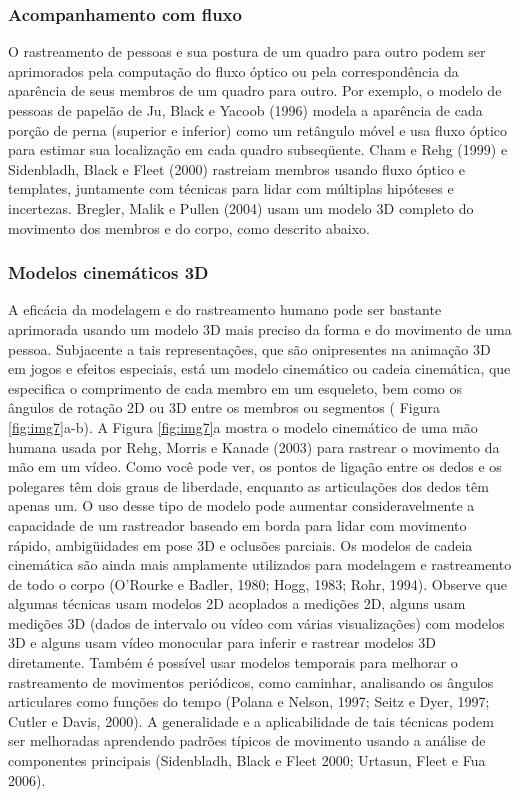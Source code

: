 \documentclass{article}
\begin{document}
\subsubsection{Acompanhamento com fluxo}
O rastreamento de pessoas e sua postura de um quadro para outro podem ser aprimorados pela computação do fluxo óptico ou pela correspondência da aparência de seus membros de um quadro para outro. Por exemplo, o modelo de pessoas de papelão de Ju, Black e Yacoob (1996) modela a aparência de cada porção de perna (superior e inferior) como um retângulo móvel e usa fluxo óptico para estimar sua localização em cada quadro subseqüente. Cham e Rehg (1999) e Sidenbladh, Black e Fleet (2000) rastreiam membros usando fluxo óptico e templates, juntamente com técnicas para lidar com múltiplas hipóteses e incertezas. Bregler, Malik e Pullen (2004) usam um modelo 3D completo do movimento dos membros e do corpo, como descrito abaixo.

\subsubsection{Modelos cinemáticos 3D}
A eficácia da modelagem e do rastreamento humano pode ser bastante aprimorada usando um modelo 3D mais preciso da forma e do movimento de uma pessoa. Subjacente a tais representações, que são onipresentes na animação 3D em jogos e efeitos especiais, está um modelo cinemático ou cadeia cinemática, que especifica o comprimento de cada membro em um esqueleto, bem como os ângulos de rotação 2D ou 3D entre os membros ou segmentos ( Figura \ref{fig:img7}a-b).
A Figura \ref{fig:img7}a mostra o modelo cinemático de uma mão humana usada por Rehg, Morris e Kanade (2003) para rastrear o movimento da mão em um vídeo. Como você pode ver, os pontos de ligação entre os dedos e os polegares têm dois graus de liberdade, enquanto as articulações dos dedos têm apenas um. O uso desse tipo de modelo pode aumentar consideravelmente a capacidade de um rastreador baseado em borda para lidar com movimento rápido, ambigüidades em pose 3D e oclusões parciais. Os modelos de cadeia cinemática são ainda mais amplamente utilizados para modelagem e rastreamento de todo o corpo (O'Rourke e Badler, 1980; Hogg, 1983; Rohr, 1994). Observe que algumas técnicas usam modelos 2D acoplados a medições 2D, alguns usam medições 3D (dados de intervalo ou vídeo com várias visualizações) com modelos 3D e alguns usam vídeo monocular para inferir e rastrear modelos 3D diretamente. Também é possível usar modelos temporais para melhorar o rastreamento de movimentos periódicos, como caminhar, analisando os ângulos articulares como funções do tempo (Polana e Nelson, 1997; Seitz e Dyer, 1997; Cutler e Davis, 2000). A generalidade e a aplicabilidade de tais técnicas podem ser melhoradas aprendendo padrões típicos de movimento usando a análise de componentes principais (Sidenbladh, Black e Fleet 2000; Urtasun, Fleet e Fua 2006).
\end{document}
